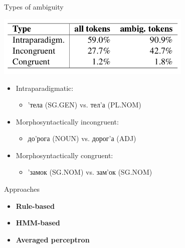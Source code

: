 \documentclass{beamer}
\begin{document}
\begin{frame}{Types of ambiguity}

\begin{center}
\includegraphics[width=0.7\textwidth]{images/ambig-types.png}
\end{center}

\begin{itemize}
  \item Intraparadigmatic:
  \begin{itemize}
    \item 'тела (SG.GEN) vs. тел'а (PL.NOM)
  \end{itemize}
  \item Morphosyntactically incongruent:
  \begin{itemize}
    \item до'рога (NOUN) vs. дорог'а (ADJ)
  \end{itemize}
  \item Morphosyntactically congruent:
  \begin{itemize}
    \item 'замок (SG.NOM) vs. зам'ок (SG.NOM)
  \end{itemize}
\end{itemize}

\end{frame}






\begin{frame}{Approaches}

\begin{itemize}
   \item \textbf{Rule-based} 
   \item \textbf{HMM-based} 
   \item \textbf{Averaged perceptron}
\end{itemize}

\end{frame}
\end{document}
